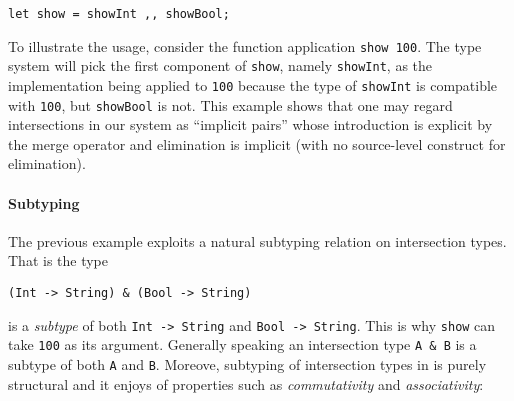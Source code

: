 \begin{lstlisting}
let show = showInt ,, showBool;
\end{lstlisting}

To illustrate the usage, consider the function application \lstinline{show 100}.
The type system will pick the first component of \lstinline{show}, namely
\lstinline{showInt}, as the implementation being applied to \lstinline{100}
because the type of \lstinline{showInt} is compatible with \lstinline{100}, but
\lstinline{showBool} is not. This example shows that one may regard
intersections in our system as ``implicit pairs'' whose introduction is explicit
by the merge operator and elimination is implicit (with no source-level
construct for elimination).








\paragraph{Subtyping} The previous example exploits a natural
subtyping relation on intersection types. That is the type

\begin{lstlisting}
(Int -> String) & (Bool -> String) 
\end{lstlisting}

\noindent is a \emph{subtype} of both \lstinline{Int -> String} 
and \lstinline{Bool -> String}. This is why \lstinline{show} 
can take \lstinline{100} as its argument.
Generally speaking an intersection type \lstinline{A & B} is
a subtype of both \lstinline{A} and \lstinline{B}. 
Moreove, subtyping of intersection types in \name is purely structural
and it enjoys of properties such as \emph{commutativity} and \emph{associativity}: \\

